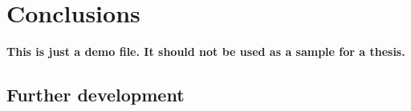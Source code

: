 \chapter{Conclusions}
\label{chapter:conclusions}

\textbf{This is just a demo file. It should not be used as a sample for a thesis.}\\

\section{Further development}
\label{sec:further-development}
